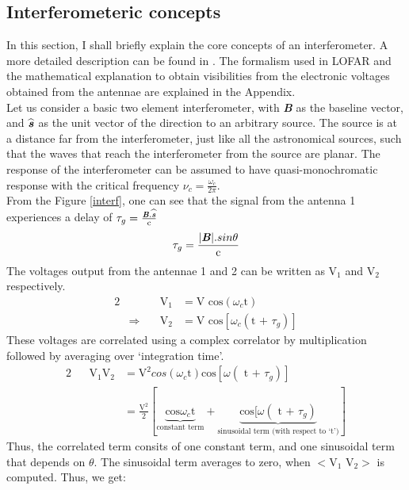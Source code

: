 \documentclass[../main/thesis_msc.tex]{subfiles}
\begin{document}
\subsection{Interferometeric concepts}
In this section, I shall briefly explain the core concepts of an interferometer. A more detailed description can be found in \citet{2001isra.book.....T}. The formalism used in LOFAR and the mathematical explanation to obtain visibilities from the electronic voltages obtained from the antennae are explained in the Appendix.\\
\noindent Let us consider a basic two element interferometer, with \textbf{\textit{B}} as the baseline vector, and $\widehat{\textbf{\textit{s}}}$ as the unit vector of the direction to an arbitrary source. The source is at a distance far from the interferometer, just like all the astronomical sources, such that the waves that reach the interferometer from the source are planar. The response of the interferometer can be assumed to have quasi-monochromatic response with the critical frequency $\nu_c = \frac{\omega_c}{2\pi}$. \\
\noindent From the Figure \ref{interf}, one can see that the signal from the antenna 1 experiences a delay of $\tau_g = \frac{\textbf{\textit{B}} . \widehat{\textbf{\textit{s}}}}{\textrm{c}}$ 
\begin{equation}
\tau_g =  \frac{\vert \textbf{\textit{B}} \vert . sin \theta}{\textrm{c}}
\end{equation}
\noindent The voltages output from the antennae 1 and 2 can be written as V$_1$ and V$_2$ respectively. 
\begin{alignat}{2}
  &&\textrm{V}_1 
  &= \textrm{V cos}(\omega_c \textrm{t})\\
  &\Rightarrow\quad
  &\textrm{V}_2 
  &= \textrm{V cos}[\omega_c (\textrm{t + } \tau_g)]
\end{alignat}
\noindent These voltages are correlated using a complex correlator by multiplication followed by averaging over `integration time'.
\begin{alignat}{2}
&&\textrm{V}_1 \textrm{V}_2 
&= \textrm{V}^2 cos(\omega_c \textrm{t})\textrm{cos}[\omega(\textrm{ t + }\tau_g)]\\
&&&= \frac{\textrm{V}^2}{2}[ \underbrace{\textrm{cos} \omega_c \textrm{t}}_{\textrm{constant term}} + \underbrace{\textrm{cos}[\omega(\textrm{ t + }\tau_g)}_{\textrm{sinusoidal term (with respect to `t')}}]
\end{alignat}
\noindent Thus, the correlated term consits of one constant term, and one sinusoidal term that depends on $\theta$. The sinusoidal term averages to zero, when $<$V$_1$ V$_2>$ is computed. Thus, we get:
\end{document}

